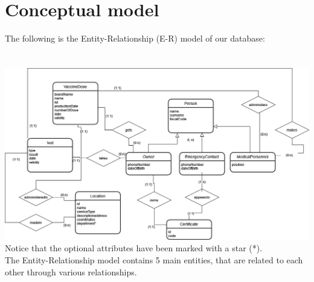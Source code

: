 \documentclass{article}
\begin{document}
\section{Conceptual model}
The following is the Entity-Relationship (E-R) model of our database:\\ \\ \\
\vspace{1cm}
\includegraphics[trim=1cm 1cm 1cm 1cm, width=15cm]{images/e-r.png}
Notice that the optional attributes have been marked with a star (*).\\
The Entity-Relationship model contains 5 main entities, that are related to each other through various relationships.
\end{document}
